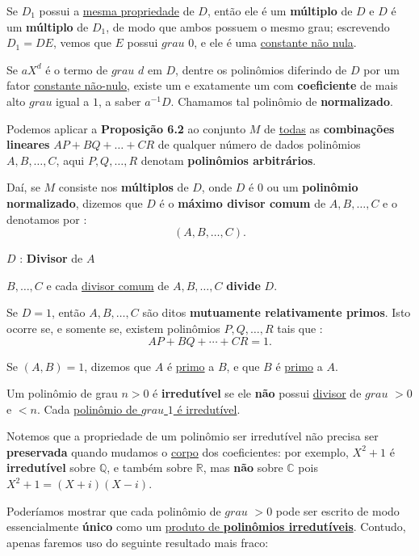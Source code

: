 Se $D_{1}$ possui a \underline{mesma propriedade} de $D$, então ele é um \textbf{múltiplo} de $D$ e $D$ é um \textbf{múltiplo} de $D_{1}$, 
de modo que ambos possuem o mesmo grau; escrevendo $D_{1} = DE$, vemos que $E$ possui $grau$ $0$, e 
ele é uma \underline{constante não nula}.

\vspace{0.3cm}
Se $aX^{d}$ é o termo de $grau$ $d$ em $D$, dentre os polinômios diferindo de $D$ por um fator \underline{constante não-nulo},
existe um e exatamente um com \textbf{coeficiente} de mais alto $grau$ igual a $1$, a saber $a^{-1}D$. Chamamos tal
polinômio de \textbf{normalizado}.

Podemos aplicar a \textbf{Proposição 6.2} ao conjunto $M$ de \underline{todas} as \textbf{combinações lineares} 
$AP + BQ + \ldots + CR$ de qualquer número de dados polinômios $A, B, \ldots, C$, aqui $P, Q, \ldots, R$ 
denotam \textbf{polinômios arbitrários}. 

Daí, se $M$ consiste nos \textbf{múltiplos} de $D$, onde $D$ é $0$ ou um \textbf{polinômio normalizado}, dizemos que 
$D$ é o \textbf{máximo divisor comum} de $A, B, \ldots, C$ e o denotamos por :
\[
(A, B, \ldots, C).
\]

$D$ : \textbf{Divisor} de $A$ 

$B, \ldots, C$ e cada \underline{divisor comum} de $A, B, \ldots, C$ \textbf{divide} $D$.

Se $D = 1$, então $A, B, \ldots, C$ são ditos \textbf{mutuamente relativamente primos}. Isto ocorre se, e 
somente se, existem polinômios $P, Q, \ldots, R$ tais que : 
\[
\boxed{AP + BQ + \cdots + CR = 1}.
\]

Se $(A, B) = 1$, dizemos que $A$ é \underline{primo} a $B$, e que $B$ é \underline{primo} a $A$.

\vspace{0.2cm}
Um polinômio de grau $n > 0$ é \textbf{irredutível} se ele \textbf{não} possui \underline{divisor} de $grau$ $> 0$ e $< n$. 
Cada \underline{polinômio de $grau$ $1$ é irredutível}. 

Notemos que a propriedade de um polinômio ser irredutível não precisa ser \textbf{preservada} quando mudamos o 
\underline{corpo} dos coeficientes: por exemplo, $X^2 + 1$ é \textbf{irredutível} sobre $\mathbb{Q}$, e também sobre $\mathbb{R}$, 
mas \textbf{não} sobre $\mathbb{C}$ pois $X^2 + 1 = (X+i)(X-i)$.

\vspace{0.2cm}
Poderíamos mostrar que cada polinômio de $grau$ $> 0$ pode ser escrito de 
modo essencialmente \textbf{único} como um \underline{produto de \textbf{polinômios irredutíveis}}. Contudo, apenas faremos uso do
seguinte resultado mais fraco:


